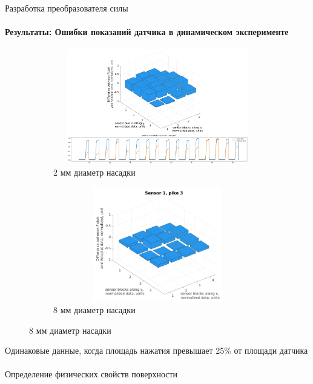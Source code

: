 \documentclass[aspectratio=169,xcolor=table]{beamer}
\begin{document}
\begin{frame}[t]{Разработка преобразователя силы}
    \framesubtitle{Результаты: Ошибки показаний датчика в динамическом эксперименте}
    \vspace{-15pt}
    \begin{figure}[H]
        \begin{subfigure}{0.64\textwidth}
            \centering\includegraphics[height=5cm,width=1\textwidth,keepaspectratio]{sens1_pike1_mod.png}
            \caption*{2 мм диаметр насадки}
            \label{fig:sens1_pike1}
        \end{subfigure}
        \begin{subfigure}{0.34\textwidth}
            \centering\includegraphics[height=5cm,width=1\textwidth,keepaspectratio]{sens1_pike3.png}
            \caption*{8 мм диаметр насадки}
            \label{fig:sens1_pike3}
        \end{subfigure}
    \end{figure}
    \vspace{-0.8cm}
    \alert{Одинаковые данные, когда площадь нажатия превышает 25\% от площади датчика}
\end{frame}


\begin{frame}[c]{}
    \framesubtitle{}
    \centering\LARGE Определение физических свойств поверхности
\end{frame}
\end{document}
